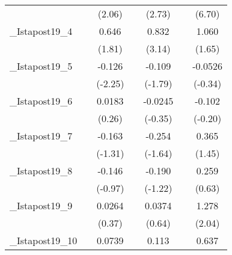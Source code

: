 {\begin{tabular}{l*{6}{c}}
            &                     &      (2.06)         &                     &      (2.73)         &                     &      (6.70)         \\
[1em]
\_Istapost19\_4&                     &       0.646         &                     &       0.832\sym{**} &                     &       1.060         \\
            &                     &      (1.81)         &                     &      (3.14)         &                     &      (1.65)         \\
[1em]
\_Istapost19\_5&                     &      -0.126\sym{*}  &                     &      -0.109         &                     &     -0.0526         \\
            &                     &     (-2.25)         &                     &     (-1.79)         &                     &     (-0.34)         \\
[1em]
\_Istapost19\_6&                     &      0.0183         &                     &     -0.0245         &                     &      -0.102         \\
            &                     &      (0.26)         &                     &     (-0.35)         &                     &     (-0.20)         \\
[1em]
\_Istapost19\_7&                     &      -0.163         &                     &      -0.254         &                     &       0.365         \\
            &                     &     (-1.31)         &                     &     (-1.64)         &                     &      (1.45)         \\
[1em]
\_Istapost19\_8&                     &      -0.146         &                     &      -0.190         &                     &       0.259         \\
            &                     &     (-0.97)         &                     &     (-1.22)         &                     &      (0.63)         \\
[1em]
\_Istapost19\_9&                     &      0.0264         &                     &      0.0374         &                     &       1.278\sym{*}  \\
            &                     &      (0.37)         &                     &      (0.64)         &                     &      (2.04)         \\
[1em]
\_Istapost19\_10&                     &      0.0739         &                     &       0.113         &                     &       0.637         \\

\end{tabular}}
